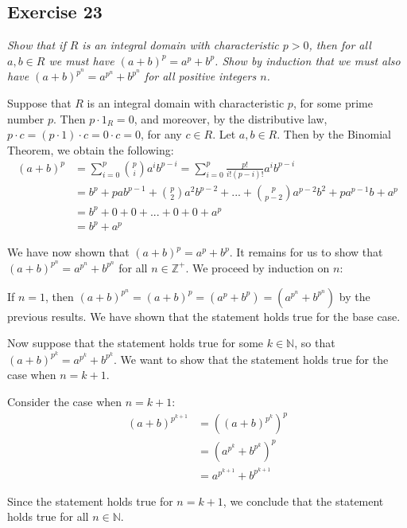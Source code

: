 \subsection*{Exercise 23}
\textit{Show that if $R$ is an integral domain with characteristic $p > 0$, then for all $a,b \in R$ we must have $(a+b)^p = a^p + b^p$. Show by induction that we must also have $(a+b)^{p^n} = a^{p^n} + b^{p^n}$ for all positive integers $n$.}

\vspace{5 mm}
Suppose that $R$ is an integral domain with characteristic $p$, for some prime number $p$. Then $p \cdot 1_R = 0$, and moreover, by the distributive law, $p\cdot c = (p \cdot 1)\cdot c = 0 \cdot c = 0$, for any $c \in R$. Let $a,b \in R$. Then by the Binomial Theorem, we obtain the following:
\begin{align*}
    (a+b)^p &= \sum_{i=0}^p \binom{p}{i} a^ib^{p-i} = \sum_{i=0}^p \frac{p!}{i!(p-i)!} a^ib^{p-i} \\
    &= b^p + pab^{p-1} + \binom{p}{2}a^2b^{p-2} + ... + \binom{p}{p-2}a^{p-2}b^2 + pa^{p-1}b + a^p \\
    &= b^p + 0 + 0 + ... + 0 + 0 + a^p \\
    &= b^p + a^p
\end{align*}

We have now shown that $(a+b)^p = a^p + b^p$. It remains for us to show that $(a+b)^{p^n} = a^{p^n} + b^{p^n}$ for all $n \in \mathbb{Z}^+$. We proceed by induction on $n$:

If $n = 1$, then $(a + b)^{p^n} = (a+b)^p = (a^p + b^p) = (a^{p^n} + b^{p^n})$ by the previous results. We have shown that the statement holds true for the base case. 

Now suppose that the statement holds true for some $k \in \mathbb{N}$, so that $(a+b)^{p^k} = a^{p^k} + b^{p^k}$. We want to show that the statement holds true for the case when $n = k + 1$.

Consider the case when $n = k+1$: 
\begin{align*}
    (a+b)^{p^{k+1}} &= ((a+b)^{p^k})^p \\
    &= (a^{p^k} + b^{p^k})^p \\
    &= a^{p^{k+1}} + b^{p^{k+1}}
\end{align*}

Since the statement holds true for $n=k+1$, we conclude that the statement holds true for all $n \in \mathbb{N}$.